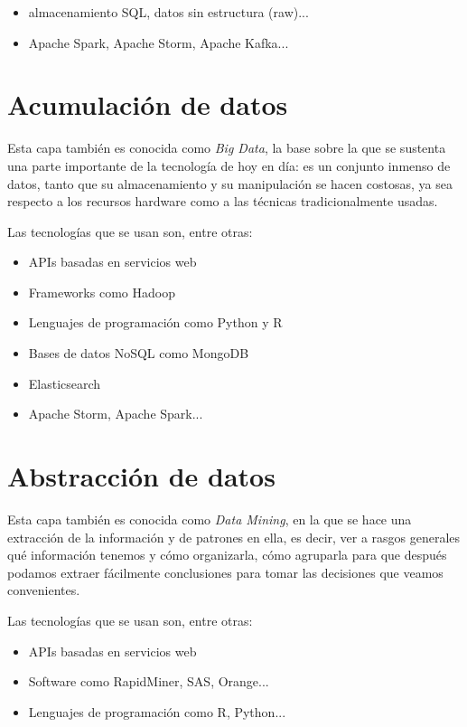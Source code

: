 \documentclass{article}
\begin{document}
\begin{itemize}
\item almacenamiento SQL, datos sin estructura (raw)...
\item Apache Spark, Apache Storm, Apache Kafka...
\end{itemize}

\section{Acumulación de datos}

Esta capa también es conocida como \textit{Big Data}, la base sobre la que se sustenta una parte importante de la tecnología de hoy en día: es un conjunto inmenso de datos, tanto que su almacenamiento y su manipulación se hacen costosas, ya sea respecto a los recursos hardware como a las técnicas tradicionalmente usadas.

Las tecnologías que se usan son, entre otras:

\begin{itemize}
\item APIs basadas en servicios web
\item Frameworks como Hadoop
\item Lenguajes de programación como Python y R
\item Bases de datos NoSQL como MongoDB
\item Elasticsearch
\item Apache Storm, Apache Spark...
\end{itemize}

\section{Abstracción de datos}

Esta capa también es conocida como \textit{Data Mining}, en la que se hace una extracción de la información y de patrones en ella, es decir, ver a rasgos generales qué información tenemos y cómo organizarla, cómo agruparla para que después podamos extraer fácilmente conclusiones para tomar las decisiones que veamos convenientes.

Las tecnologías que se usan son, entre otras:

\begin{itemize}
\item APIs basadas en servicios web
\item Software como RapidMiner, SAS, Orange...
\item Lenguajes de programación como R, Python...
\end{itemize}
\end{document}
